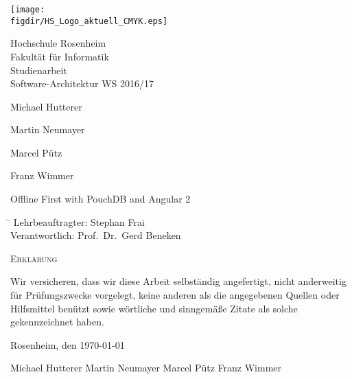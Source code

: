 \begin{titlepage}

\sffamily

\raggedleft

\texttt{[image: \\figdir/HS\_Logo\_aktuell\_CMYK.eps]}

\vfill

\centering
\Large
Hochschule Rosenheim\\
Fakultät für Informatik
\vspace{2cm}\\
 \Large
Studienarbeit\vspace{1cm}\\
 \Large
 Software-Architektur WS 2016/17 \\
 \Large

\vspace*{\fill}

Michael Hutterer

Martin Neumayer

Marcel Pütz

Franz Wimmer 

\vspace{1cm}

 \LARGE

Offline First with PouchDB and Angular 2
\vspace{1cm}

\flushleft
 \Large
\vspace*{\fill}

\begin{tabbing}
\hspace*{4cm}\= \kill
Lehrbeauftragter:\> Stephan Frai\\
Verantwortlich:\> Prof.\ Dr.\ Gerd Beneken\\
\end{tabbing}

\end{titlepage}

\cleardoubleemptypage

{
\large
\thispagestyle{empty}
\vspace*{\fill}

\noindent
\textsc{Erklärung}

\medskip

\noindent
Wir versicheren, dass wir diese Arbeit selbständig
angefertigt, nicht anderweitig für Prüfungszwecke
vorgelegt, keine anderen als die angegebenen Quellen
oder Hilfsmittel benützt sowie wörtliche und
sinngemäße Zitate als solche gekennzeichnet haben.

\bigskip

\noindent
Rosenheim, den \today

\vspace*{2cm}

\noindent
 Michael Hutterer\hspace{.8cm} Martin Neumayer \hspace{.8cm} Marcel Pütz \hspace{.8cm} Franz Wimmer\\
}


